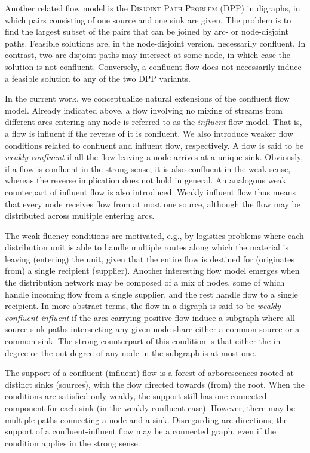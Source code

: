 \documentclass[pdflatex,sn-mathphys-num]{sn-jnl}%
\theoremstyle{thmstyleone}%
\begin{document}
Another related flow model is the \textsc{Disjoint Path Problem} (DPP) \citep{kolliopoulos2007unsplittable} in digraphs, in which pairs consisting of one source and one sink are given.
The problem is to find the largest subset of the pairs that can be joined by arc- or node-disjoint paths.
Feasible solutions are, in the node-disjoint version, necessarily confluent.
In contrast, two arc-disjoint paths may intersect at some node, in which case the solution is not confluent.
Conversely, a confluent flow does not necessarily induce a feasible solution to any of the two DPP variants.

In the current work, we conceptualize natural extensions of the confluent flow model.
Already indicated above, a flow involving no mixing of streams from different arcs entering any node is referred to as the \emph{influent} flow model.
That is, a flow is influent if the reverse of it is confluent. We also introduce weaker flow conditions related to confluent and influent flow, respectively.
A flow is said to be \emph{weakly confluent} if all the flow leaving a node arrives at a unique sink.
Obviously, if a flow is confluent in the strong sense, it is also confluent in the weak sense, whereas the reverse implication does not hold in general.
An analogous weak counterpart of influent flow is also introduced.
Weakly influent flow thus means that every node receives flow from at most one source, although the flow may be distributed across multiple entering arcs.

The weak fluency conditions are motivated, e.g., by logistics problems where each distribution unit is able to handle multiple routes along which the material
is leaving (entering) the unit, given that the entire flow is destined for (originates from) a single recipient (supplier).
Another interesting flow model emerges when the distribution network may be composed of a mix of nodes, some of which handle incoming flow from a single supplier, and the rest handle flow to a single recipient. In more abstract terms, the flow in a digraph is said to be \emph{weakly confluent-influent} if the arcs carrying positive flow induce a subgraph where all source-sink paths intersecting any given node share either a common source or a common sink.
The strong counterpart of this condition is that either the in-degree or the out-degree of any node in the subgraph is at most one.

The support of a confluent (influent) flow is a forest of arborescences rooted at distinct sinks (sources), with the flow directed towards (from) the root.
When the conditions are satisfied only weakly, the support still has one connected component for each sink (in the weakly confluent case).
However, there may be multiple paths connecting a node and a sink.
Disregarding arc directions, the support of a confluent-influent flow may be a connected graph, even if the condition applies in the strong sense.
\end{document}
